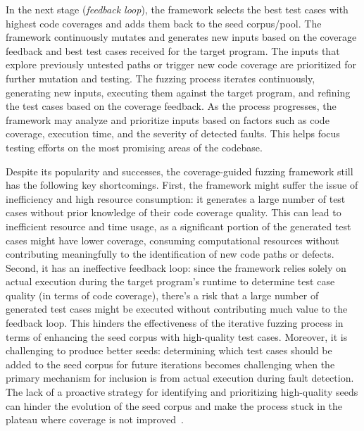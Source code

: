 In the next stage ({\em feedback loop}), the framework selects the
best test cases with highest code coverages and adds them back to the
seed corpus/pool. The framework continuously mutates and generates new
inputs based on the coverage feedback and best test cases received
for the target program. The inputs that explore previously untested
paths or trigger new code coverage are prioritized for further
mutation and testing. The fuzzing process iterates continuously,
generating new inputs, executing them against the target program, and
refining the test cases based on the coverage feedback. As the process
progresses, the framework may analyze and prioritize inputs based on
factors such as code coverage, execution time, and the severity of
detected faults. This helps focus testing efforts on the most
promising areas of the codebase.

Despite its popularity and successes, the coverage-guided fuzzing
framework still has the following key shortcomings. First, the
framework might suffer the issue of inefficiency and high resource
consumption: it generates a large number of test cases without prior
knowledge of their code coverage quality. This can lead to inefficient
resource and time usage, as a significant portion of the generated
test cases might have lower coverage, consuming computational
resources without contributing meaningfully to the identification of
new code paths or defects. Second, it has an ineffective feedback
loop: since the framework relies solely on actual execution during the
target program's runtime to determine test case quality (in terms of
code coverage), there's a risk that a large number of generated test
cases might be executed without contributing much value to
the feedback loop. This hinders the effectiveness of the iterative
fuzzing process in terms of enhancing the seed corpus with
high-quality test cases. Moreover, it is challenging to produce better
seeds: determining which test cases should be added to the seed corpus
for future iterations becomes challenging when the primary mechanism
for inclusion is from actual execution during fault detection. The
lack of a proactive strategy for identifying and prioritizing
high-quality seeds can hinder the evolution of the seed corpus and
make the process stuck in the plateau where coverage is not
improved~\cite{gao2023beyond}.


